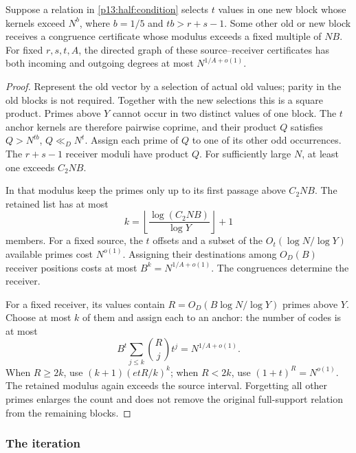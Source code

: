 \begin{lemma}
\label{p13:half:saturation}
Suppose a relation in \eqref{p13:half:condition} selects
\(t\) values in one new block whose kernels exceed \(N^b\),
where \(b=1/5\) and \(tb>r+s-1\).
Some other old or new block receives a congruence certificate
whose modulus exceeds a fixed multiple of \(NB\).
For fixed \(r,s,t,A\), the directed graph of these
source--receiver certificates has both incoming and outgoing
degrees at most \(N^{1/A+o(1)}\).
\end{lemma}

\begin{proof}
Represent the old vector by a selection of actual old values;
parity in the old blocks is not required. Together with the
new selections this is a square product.
Primes above \(Y\) cannot occur in two distinct values
of one block. The \(t\) anchor kernels are therefore
pairwise coprime, and their product \(Q\) satisfies
\(Q>N^{tb}\), \(Q\ll_D N^t\).
Assign each prime of \(Q\) to one of its other odd occurrences.
The \(r+s-1\) receiver moduli have product \(Q\).
For sufficiently large \(N\), at least one exceeds \(C_2NB\).

In that modulus keep the primes only up to its first passage
above \(C_2NB\). The retained list has at most
\[
 k=\left\lfloor\frac{\log(C_2NB)}{\log Y}\right\rfloor+1
\]
members. For a fixed source, the \(t\) offsets and a subset
of the \(O_t(\log N/\log Y)\) available primes cost
\(N^{o(1)}\). Assigning their destinations among \(O_D(B)\)
receiver positions costs at most
\(B^k=N^{1/A+o(1)}\). The congruences determine the receiver.

For a fixed receiver, its values contain
\(R=O_D(B\log N/\log Y)\) primes above \(Y\).
Choose at most \(k\) of them and assign each to an anchor:
the number of codes is at most
\[
 B^t\sum_{j\le k}\binom Rj t^j=N^{1/A+o(1)}.
\]
When \(R\ge2k\), use \((k+1)(etR/k)^k\);
when \(R<2k\), use \((1+t)^R=N^{o(1)}\).
The retained modulus again exceeds the source interval.
Forgetting all other primes enlarges the count and does not
remove the original full-support relation from the remaining
blocks.
\end{proof}

\subsubsection{The iteration}
\label{p14:comp:half:iteration}

